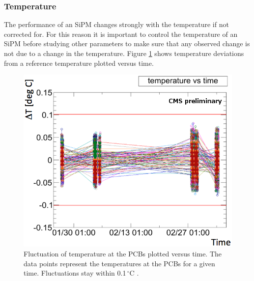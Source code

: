 \subsubsection{Temperature}
The performance of an SiPM changes strongly with the temperature if not corrected for. For this reason it is important to control the temperature of an SiPM before studying other parameters to make sure that any observed change is not due to a change in the temperature. Figure \ref{kuenskentemperatureStability} shows temperature deviations from a reference temperature plotted versus time.
\begin{figure}[h]
\centering
\begin{minipage}[t]{0.475\textwidth}
\includegraphics[width=\textwidth]{Figures/kuensken/temperature.png}
\caption{Fluctuation of temperature at the PCBs plotted versus time. The data points represent the temperatures at the PCBs for a given time. Fluctuations stay within 0.1\,$^\circ$C \cite{kuenskenCalor}.}
\label{kuenskentemperatureStability}
\end{minipage}
\hspace{0.5cm}
\begin{minipage}[t]{0.455\textwidth}

\end{minipage}
\end{figure}
